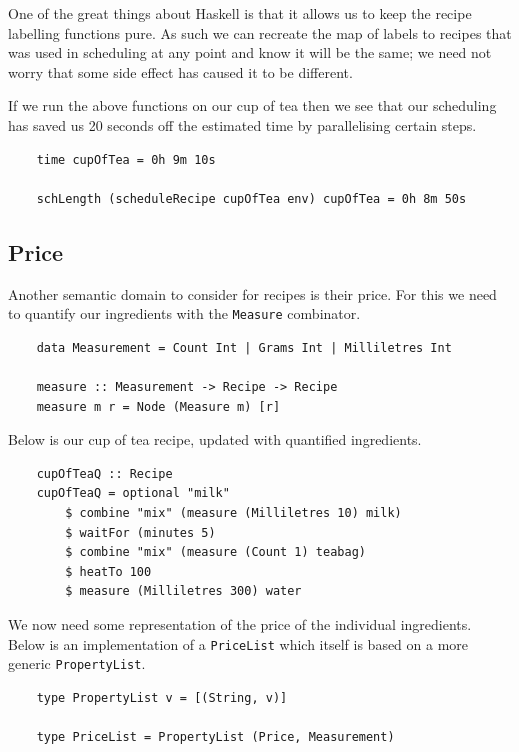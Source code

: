 \documentclass[11pt]{article}
\begin{document}
One of the great things about Haskell is that it allows us to keep the recipe labelling
functions pure. As such we can recreate the map of labels to recipes that was used in
scheduling at any point and know it will be the same; we need not worry that some side
effect has caused it to be different.

\medbreak

If we run the above functions on our cup of tea then we see that our scheduling has
saved us 20 seconds off the estimated time by parallelising certain steps.

\begin{lstlisting}
    time cupOfTea = 0h 9m 10s

    schLength (scheduleRecipe cupOfTea env) cupOfTea = 0h 8m 50s
\end{lstlisting}

\subsection{Price}

Another semantic domain to consider for recipes is their price. For this we
need to quantify our ingredients with the \texttt{Measure} combinator.

\begin{lstlisting}
    data Measurement = Count Int | Grams Int | Milliletres Int

    measure :: Measurement -> Recipe -> Recipe
    measure m r = Node (Measure m) [r]
\end{lstlisting}

Below is our cup of tea recipe, updated with quantified ingredients.

\begin{lstlisting}
    cupOfTeaQ :: Recipe
    cupOfTeaQ = optional "milk"
        $ combine "mix" (measure (Milliletres 10) milk)
        $ waitFor (minutes 5)
        $ combine "mix" (measure (Count 1) teabag)
        $ heatTo 100
        $ measure (Milliletres 300) water
\end{lstlisting}

We now need some representation of the price of the individual ingredients.
Below is an implementation of a \texttt{PriceList} which itself is based on
a more generic \texttt{PropertyList}.

\begin{lstlisting}
    type PropertyList v = [(String, v)]

    type PriceList = PropertyList (Price, Measurement)
\end{lstlisting}
\end{document}
